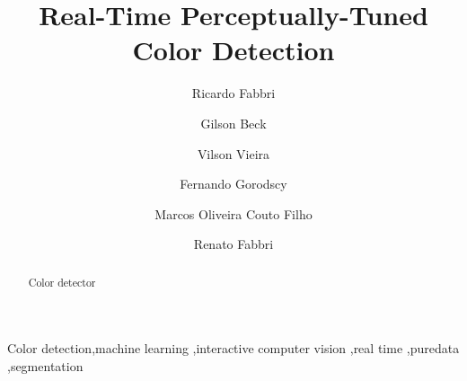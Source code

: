 \begin{frontmatter}

\title{Real-Time Perceptually-Tuned Color Detection} 



\author[iprj,aa]{Ricardo Fabbri}


\author[aa]{Gilson Beck}

\author[ifsc,aa]{Vilson Vieira}

\author[icmc,aa]{Fernando Gorodscy}

\author[iprj]{Marcos Oliveira Couto Filho}

\author[ifsc,aa]{Renato Fabbri}

\address[iprj]{Instituto Polit\'{e}cnico, Universidade do Estado do Rio de
Janeiro\\C.P.: 97282 - 28601-970 - Nova Friburgo, RJ, Brazil}

\address[ifsc]{Instituto de F\'{i}sica de S\~{a}o Carlos (IFSC), Universidade de
S\~{a}o Paulo (USP)\\ Av.  Trabalhador S\~{a}o Carlense, 400,
13560-970 - S\~{a}o Carlos, SP, Brazil}

\address[icmc]{Instituto de Ci\^{e}ncias Matem\'{a}ticas e de
Computa\,{c}\~{a}o (ICMC), Universidade de
S\~{a}o Paulo (USP)\\ Av.  Trabalhador S\~{a}o Carlense, 400,
13560-970 - S\~{a}o Carlos, SP, Brazil}

\address[aa] {LabMacambira.sourceforge.net distributed hacker group}




\begin{abstract}
Color detector 
\end{abstract}

\begin{keyword}
Color detection\sep machine learning \sep interactive
computer vision \sep real time \sep puredata \sep segmentation
\end{keyword}

\end{frontmatter}
